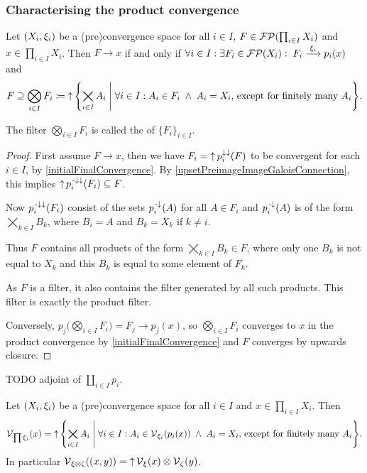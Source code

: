 \subsubsection{Characterising the product convergence}
\begin{proposition} \label{convergenceProductFilter}
Let $\sSet{X_i, \xi_i}$ be a (pre)convergence space for all $i\in I$, $F \in \operatorname{\mathcal{FP}}(\prod_{i\in I}X_i)$ and $x\in \prod_{i\in I}X_i$. Then $F\to x$ \textup{if and only if} $\forall i\in I: \exists F_i\in \operatorname{\mathcal{FP}}(X_i): 
\; F_i \overset{\xi_i}{\longrightarrow} p_i(x)$ and
\[ F \supseteq \bigotimes_{i\in I}F_i \defeq \upset\setbuilder{\bigtimes_{i\in I}A_i}{\forall i\in I: A_i \in F_i \;\land\; A_i = X_i, \,\text{except for finitely many $A_i$}}. \]
\end{proposition}
The filter $\bigotimes_{i\in I}F_i$ is called the  of $\{F_i\}_{i\in I}$.
\begin{proof}
First assume $F\to x$, then we have $F_i = \operatorname{\uparrow} p_i^{\downarrow\downarrow}(F)$ to be convergent for each $i\in I$, by \ref{initialFinalConvergence}. By \ref{upsetPreimageImageGaloisConnection}, this implies $\operatorname{\uparrow} p_i^{{\text{\hspace{0.15em}-}\downarrow}\downarrow}(F_i) \subseteq F$.

Now $p_i^{{\text{\hspace{0.15em}-}\downarrow}\downarrow}(F_i)$ consist of the sets $p_i^{\text{\hspace{0.15em}-}\downarrow}(A)$ for all $A\in F_i$ and $p_i^{\text{\hspace{0.15em}-}\downarrow}(A)$ is of the form $\bigtimes_{k\in I}B_k$, where $B_i = A$ and $B_k = X_k$ if $k \neq i$.

Thus $F$ contains all products of the form $\bigtimes_{k\in I}B_k \in F$, where only one $B_k$ is not equal to $X_k$ and this $B_k$ is equal to some element of $F_k$.

As $F$ is a filter, it also contains the filter generated by all such products. This filter is exactly the product filter.

Conversely, $p_j\Big(\bigotimes_{i\in I}F_i\Big) = F_j \to p_j(x)$, so $\bigotimes_{i\in I}F_i$ converges to $x$ in the product convergence by \ref{initialFinalConvergence} and $F$ converges by upwards closure.
\end{proof}
TODO adjoint of $\coprod_{i\in I}p_i$.
\begin{corollary} \label{productVicinity}
Let $\sSet{X_i, \xi_i}$ be a (pre)convergence space for all $i\in I$ and $x\in \prod_{i\in I}X_i$. Then
\[\vicinities_{\prod \xi_i}(x) = \upset \setbuilder{\bigtimes_{i\in I}A_i}{\forall i\in I: A_i \in \vicinities_{\xi_i}(p_i(x)) \;\land\; A_i = X_i, \,\text{except for finitely many $A_i$}}. \]
In particular $\operatorname{\mathcal{V}}_{\xi\otimes \zeta}((x,y)) = \operatorname{\uparrow} \operatorname{\mathcal{V}}_\xi(x)\otimes \operatorname{\mathcal{V}}_\zeta(y)$.
\end{corollary}

